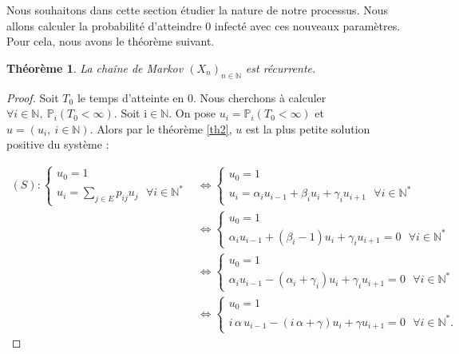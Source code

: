 \documentclass[12pt,a4paper]{report}
\newtheorem{thm}{Théorème}[section]
\theoremstyle{remark}
\begin{document}
Nous souhaitons dans cette section étudier la nature de notre processus. Nous allons calculer la probabilité d'atteindre $0$ infecté avec ces nouveaux paramètres. Pour cela, nous avons le théorème suivant.

\begin{thm}
La chaîne de Markov $(X_n)_{n \in \mathbb{N}}$ est récurrente.
\end{thm}
\begin{proof}
Soit $T_0$ le temps d'atteinte en $0$. Nous cherchons à calculer $\forall i\in \mathbb{N}, \ \mathbb{P}_i(T_0 < \infty)$. Soit i$\in\mathbb{N}$. On pose $u_i=\mathbb{P}_i(T_0 < \infty)$ et $u=(u_i,\  i\in \mathbb{N})$. Alors par le théorème \ref{th2}, $u$ est la plus petite solution  positive du système :

\begin{align*}
(S) : \left\{
\begin{array}{ll}
        u_0=1\\
        u_i= \sum\limits_{j\in E} p_{ij}u_j \ \ \ \forall i \in \mathbb{N}^*
    \end{array}
\right.
&\Longleftrightarrow  \left\{
\begin{array}{ll}
        u_0=1\\
        u_i= \alpha_i u_{i-1} + \beta_i u_i + \gamma_i u_{i+1} \ \ \ \forall i \in \mathbb{N}^*
    \end{array}
\right.  \\
&\Longleftrightarrow \left\{
\begin{array}{ll}
        u_0=1\\
        \alpha_i u_{i-1} + (\beta_i-1) u_i + \gamma_i u_{i+1} = 0 \ \ \ \forall i \in \mathbb{N}^*
    \end{array}
\right.  \\
 &\Longleftrightarrow \left\{
\begin{array}{ll}
        u_0=1\\
        \alpha_i u_{i-1} - (\alpha_i+\gamma_i) u_i + \gamma_i u_{i+1} = 0 \ \ \ \forall i \in \mathbb{N}^*
    \end{array}
\right.  \\
 &\Longleftrightarrow \left\{
\begin{array}{ll}
        u_0=1\\
        i \, \alpha \, u_{i-1} - (i \, \alpha+\gamma) u_i + \gamma u_{i+1} = 0 \ \ \ \forall i \in \mathbb{N}^*.
    \end{array}
\right.
\end{align*}


\end{proof}
\end{document}
